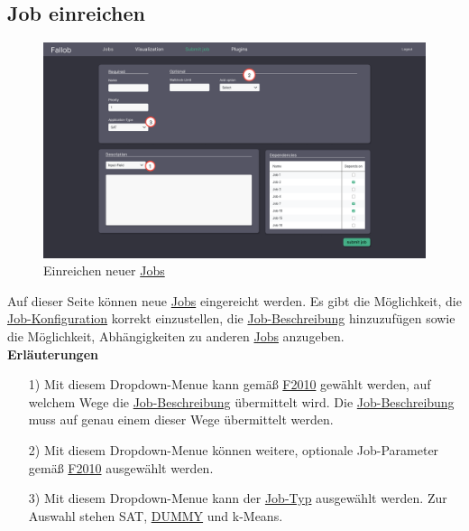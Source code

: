 \subsection{Job einreichen}
\label{pages:submit-job}
\begin{figure}[H]
    \centering
    \includegraphics[width=\textwidth]{images-interface/v4_interface/submit_job_page_4.pdf}
    \caption{Einreichen neuer \hyperref[B:Jobs]{Jobs}}
    \label{fig:submit-job}
\end{figure}
Auf dieser Seite können neue \hyperref[B:Jobs]{Jobs} eingereicht werden. Es gibt die Möglichkeit, die \hyperref[B:Job-Konfiguration]{Job-Konfiguration} korrekt einzustellen, die \hyperref[B:Job-Beschreibung]{Job-Beschreibung} hinzuzufügen sowie die Möglichkeit, Abhängigkeiten zu anderen \hyperref[B:Jobs]{Jobs} anzugeben. \\

\textbf{Erläuterungen}
\begin{itemize}
    \item[1)] Mit diesem \gls{Dropdown-Menue} kann gemäß \hyperref[FA:Web-Interface:Job einreichen]{F2010} gewählt werden, auf welchem Wege die \hyperref[B:Job-Beschreibung]{Job-Beschreibung} übermittelt wird. Die \hyperref[B:Job-Beschreibung]{Job-Beschreibung} muss auf genau einem dieser Wege übermittelt werden.
    \item[2)] Mit diesem \gls{Dropdown-Menue} können weitere, optionale Job-Parameter gemäß \hyperref[FA:Web-Interface:Job einreichen]{F2010} ausgewählt werden. 
    \item[3)] Mit diesem \gls{Dropdown-Menue} kann der \hyperref[B:Job-Typ]{Job-Typ} ausgewählt werden. Zur Auswahl stehen \gls{SAT}, \hyperref[B:Job-Typ]{DUMMY} und \gls{k-Means}.
\end{itemize}

\newpage
